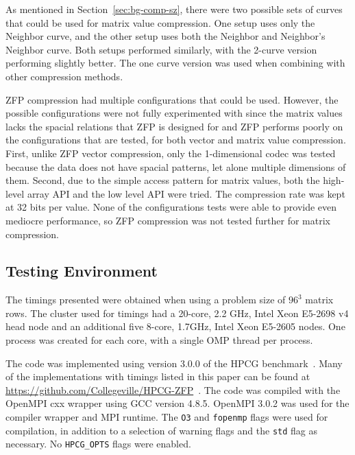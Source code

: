 As mentioned in Section~\ref{sec:bg-comp-sz}, there were two possible sets of curves that could be used for matrix value compression.
One setup uses only the Neighbor curve, and the other setup uses both the Neighbor and Neighbor's Neighbor curve.
Both setups performed similarly, with the 2-curve version performing slightly better.
The one curve version was used when combining with other compression methods.

ZFP compression had multiple configurations that could be used.
However, the possible configurations were not fully experimented with since the matrix values lacks the spacial relations that ZFP is designed for and ZFP performs poorly on the configurations that are tested, for both vector and matrix value compression.
First, unlike ZFP vector compression, only the 1-dimensional codec was tested because the data does not have spacial patterns, let alone multiple dimensions of them.
Second, due to the simple access pattern for matrix values, both the high-level array API and the low level API were tried.
The compression rate was kept at 32 bits per value.
None of the configurations tests were able to provide even mediocre performance, so ZFP compression was not tested further for matrix compression.

\subsection{Testing Environment}
The timings presented were obtained when using a problem size of \(96^3\) matrix rows.
The cluster used for timings had a 20-core, 2.2 GHz, Intel Xeon E5-2698 v4 head node and an additional five 8-core, 1.7GHz, Intel Xeon E5-2605 nodes.
One process was created for each core, with a single OMP thread per process.

The code was implemented using version 3.0.0 of the HPCG benchmark~\cite{Dongarra:2015:HPCG}.
Many of the implementations with timings listed in this paper can be found at \url{https://github.com/Collegeville/HPCG-ZFP}~\cite{Lindquist:2018:projectGithub}.
The code was compiled with the OpenMPI cxx wrapper using GCC version 4.8.5.
OpenMPI 3.0.2 was used for the compiler wrapper and MPI runtime.
The \texttt{O3} and \texttt{fopenmp} flags were used for compilation, in addition to a selection of warning flags and the \texttt{std} flag as necessary.
No \texttt{HPCG\_OPTS} flags were enabled.